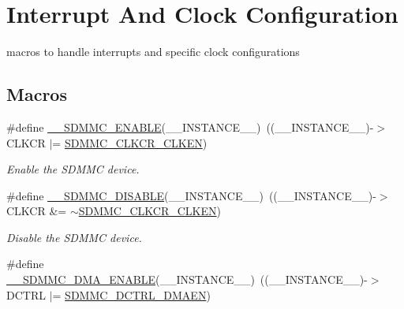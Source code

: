 \hypertarget{group___s_d_m_m_c___l_l___interrupt___clock}{}\section{Interrupt And Clock Configuration}
\label{group___s_d_m_m_c___l_l___interrupt___clock}


macros to handle interrupts and specific clock configurations  


\subsection*{Macros}
\begin{DoxyCompactItemize}
\item 
\#define \mbox{\hyperlink{group___s_d_m_m_c___l_l___interrupt___clock_ga20f2287a3097b96bd7e020919a4d0057}{\+\_\+\+\_\+\+S\+D\+M\+M\+C\+\_\+\+E\+N\+A\+B\+LE}}(\+\_\+\+\_\+\+I\+N\+S\+T\+A\+N\+C\+E\+\_\+\+\_\+)~((\+\_\+\+\_\+\+I\+N\+S\+T\+A\+N\+C\+E\+\_\+\+\_\+)-\/$>$C\+L\+K\+CR $\vert$= \mbox{\hyperlink{group___peripheral___registers___bits___definition_gac1e13de2f05aca8fb35f2ed47a4e02a6}{S\+D\+M\+M\+C\+\_\+\+C\+L\+K\+C\+R\+\_\+\+C\+L\+K\+EN}})
\begin{DoxyCompactList}\small\item\em Enable the S\+D\+M\+MC device. \end{DoxyCompactList}\item 
\#define \mbox{\hyperlink{group___s_d_m_m_c___l_l___interrupt___clock_gaf3ddbea0ba674cf1bc84fc1a4558840b}{\+\_\+\+\_\+\+S\+D\+M\+M\+C\+\_\+\+D\+I\+S\+A\+B\+LE}}(\+\_\+\+\_\+\+I\+N\+S\+T\+A\+N\+C\+E\+\_\+\+\_\+)~((\+\_\+\+\_\+\+I\+N\+S\+T\+A\+N\+C\+E\+\_\+\+\_\+)-\/$>$C\+L\+K\+CR \&= $\sim$\mbox{\hyperlink{group___peripheral___registers___bits___definition_gac1e13de2f05aca8fb35f2ed47a4e02a6}{S\+D\+M\+M\+C\+\_\+\+C\+L\+K\+C\+R\+\_\+\+C\+L\+K\+EN}})
\begin{DoxyCompactList}\small\item\em Disable the S\+D\+M\+MC device. \end{DoxyCompactList}\item 
\#define \mbox{\hyperlink{group___s_d_m_m_c___l_l___interrupt___clock_ga57d82a8c4be7b1dc8d2ff4cae11c2339}{\+\_\+\+\_\+\+S\+D\+M\+M\+C\+\_\+\+D\+M\+A\+\_\+\+E\+N\+A\+B\+LE}}(\+\_\+\+\_\+\+I\+N\+S\+T\+A\+N\+C\+E\+\_\+\+\_\+)~((\+\_\+\+\_\+\+I\+N\+S\+T\+A\+N\+C\+E\+\_\+\+\_\+)-\/$>$D\+C\+T\+RL $\vert$= \mbox{\hyperlink{group___peripheral___registers___bits___definition_ga47f4fcb4a5ec9a4e8d077a5edc82ebf8}{S\+D\+M\+M\+C\+\_\+\+D\+C\+T\+R\+L\+\_\+\+D\+M\+A\+EN}})

\end{DoxyCompactItemize}
